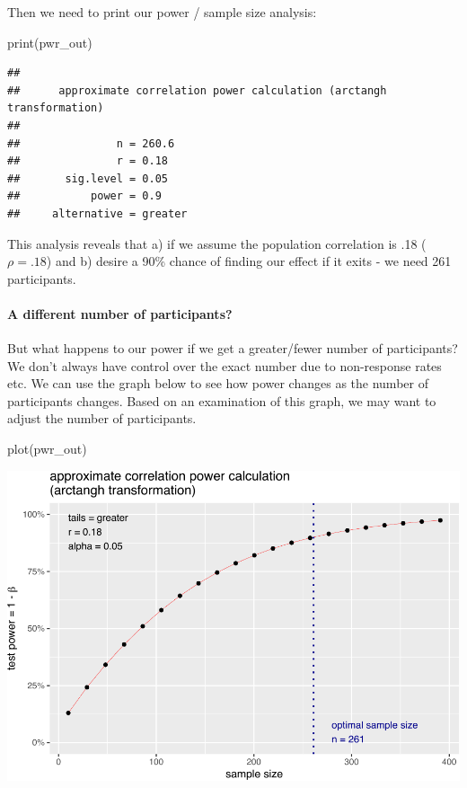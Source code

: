 \documentclass[
]{krantz}
\makeatletter
\newenvironment{Shaded}{\begin{snugshade}}{\end{snugshade}}
\newcommand{\FunctionTok}[1]{\textcolor[rgb]{0,0,0}{#1}}
\newcommand{\NormalTok}[1]{#1}
\newenvironment{kframe}{%
\medskip{}
\setlength{\fboxsep}{.8em}
 \def\at@end@of@kframe{}%
 \ifinner\ifhmode%
  \def\at@end@of@kframe{\end{minipage}}%
  \begin{minipage}{\columnwidth}%
 \fi\fi%
 \def\FrameCommand##1{\hskip\@totalleftmargin \hskip-\fboxsep
 \colorbox{shadecolor}{##1}\hskip-\fboxsep
     \hskip-\linewidth \hskip-\@totalleftmargin \hskip\columnwidth}%
 \MakeFramed {\advance\hsize-\width
   \@totalleftmargin\z@ \linewidth\hsize
   \@setminipage}}%
 {\par\unskip\endMakeFramed%
 \at@end@of@kframe}
\renewenvironment{Shaded}{\begin{kframe}}{\end{kframe}}
\makeatother
\begin{document}
Then we need to print our power / sample size analysis:

\begin{Shaded}
\begin{Highlighting}[]
\FunctionTok{print}\NormalTok{(pwr\_out)}
\end{Highlighting}
\end{Shaded}

\begin{verbatim}
## 
##      approximate correlation power calculation (arctangh transformation) 
## 
##               n = 260.6
##               r = 0.18
##       sig.level = 0.05
##           power = 0.9
##     alternative = greater
\end{verbatim}

This analysis reveals that a) if we assume the population correlation is .18 (\(\rho = .18\)) and b) desire a 90\% chance of finding our effect if it exits - we need 261 participants.

\hypertarget{a-different-number-of-participants-2}{%
\paragraph{A different number of participants?}\label{a-different-number-of-participants-2}}

But what happens to our power if we get a greater/fewer number of participants? We don't always have control over the exact number due to non-response rates etc. We can use the graph below to see how power changes as the number of participants changes. Based on an examination of this graph, we may want to adjust the number of participants.

\begin{Shaded}
\begin{Highlighting}[]
\FunctionTok{plot}\NormalTok{(pwr\_out)}
\end{Highlighting}
\end{Shaded}

\includegraphics{bookdown_files/figure-latex/unnamed-chunk-260-1.pdf}
\end{document}
